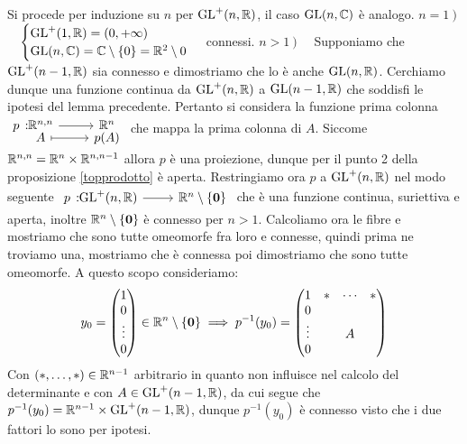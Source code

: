 \begin{theorema}
\end{theorema}
\begin{demonstration}
	Si procede per induzione su $n$ per $\operatorname{GL}^+(n,\mathbb{R})$, il caso $\operatorname{GL}(n,\mathbb{C})$ è analogo.\newline
	$n=1 \ )$ \ \ $\begin{cases}
			\operatorname{GL}^+(1,\mathbb{R})=(0,+\infty) \\
			\operatorname{GL}(n,\mathbb{C})=\mathbb{C}\setminus\{0\}=\mathbb{R}^2\setminus{0}
		\end{cases}$ connessi.\newline
	$n>1 \ )$ \ \ Supponiamo che $\operatorname{GL}^+(n-1,\mathbb{R})$ sia connesso e dimostriamo che lo è anche $\operatorname{GL}(n,\mathbb{R})$. Cerchiamo dunque una funzione continua da $\operatorname{GL}^+(n,\mathbb{R})$  a $\operatorname{GL}(n-1,\mathbb{R})$ che soddisfi le ipotesi del lemma precedente. Pertanto si considera la funzione prima colonna $\displaystyle \funztot p {\realset^{n,n}} {\realset^n} A {p(A)}$ che mappa la prima colonna di $A$. Siccome $\mathbb{R}^{n,n}=\mathbb{R}^n\times\mathbb{R}^{n,n-1}$ allora $p$ è una proiezione, dunque per il punto 2 della proposizione \ref{topprodotto}	è aperta. Restringiamo ora $p$ a $\operatorname{GL}^+(n,\mathbb{R})$ nel modo seguente $\funz p {\gl^+(n,\realset)} {\realset^n\setminus\{\mathbf{0}\}}$ che è una funzione continua, suriettiva e aperta, inoltre $\mathbb{R}^n\setminus\{\mathbf{0}\}$ è connesso per $n>1$. Calcoliamo ora le fibre e mostriamo che sono tutte omeomorfe fra loro e connesse, quindi prima ne troviamo una, mostriamo che è connessa poi dimostriamo che sono tutte omeomorfe. A questo scopo consideriamo:
		\begin{gather*}
			y_0=\begin{pmatrix}
					1 \\ 0 \\ \vdots \\ 0
				\end{pmatrix}\in \mathbb{R}^n\setminus\{\mathbf{0}\} \implies p^{-1}	(y_0)=\begin{pmatrix}
						1      & * & \cdots & *\\
						0      &   &       &  \\
						\vdots &   & A     &  \\
						0      &   &       &
					\end{pmatrix}
		\end{gather*}
	Con $(*,\dots, *)\in\mathbb{R}^{n-1}$ arbitrario in quanto non influisce nel calcolo del determinante e con $A\in\operatorname{GL}^+(n-1,\mathbb{R})$, da cui segue che $p^{-1}(y_0)=\mathbb{R}^{n-1}\times\operatorname{GL}^+(n-1,\mathbb{R})$, dunque $p^{-1}(y_0)$ è connesso visto che i due fattori lo sono per ipotesi.\newline

\end{demonstration}
